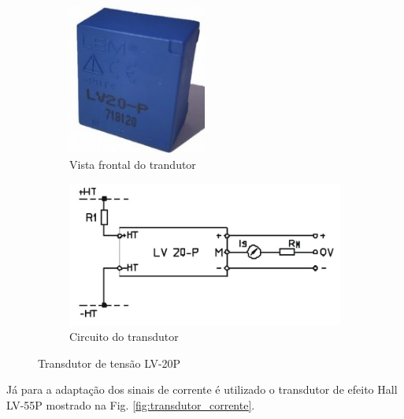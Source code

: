 \begin{figure}[!hbt]
	\centering
	\begin{subfigure}[b]{0.4\textwidth}
		\centering
		\includegraphics[width=0.5\textwidth]{figuras/Transdutor_Tensao.jpg}
		\caption{Vista frontal do trandutor}
	\end{subfigure}
	\begin{subfigure}[b]{0.4\textwidth}
		\includegraphics[width=\textwidth]{figuras/Transdutor_Tensao_Circuito.jpg}
		\caption{Circuito do transdutor}
	\end{subfigure}
	\caption{Transdutor de tensão LV-20P}\label{fig:transdutor_tensao}
\end{figure}

Já para a adaptação dos sinais de corrente é utilizado o transdutor de efeito Hall LV-55P mostrado na Fig. \ref{fig:transdutor_corrente}.


